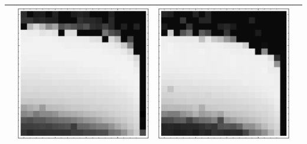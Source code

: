 \documentclass[10pt]{article}
\begin{document}
\begin{tabular}{|c|c|c|c|}
        & \includegraphics[scale=0.25]{plots/simple/LF-40B10B-20T10-MNIST-6.eps}
        & \includegraphics[scale=0.25]{plots/simple/LF-40B20B10B-20T10-MNIST-6.eps} \\ \hline
\end{tabular}
\end{document}

